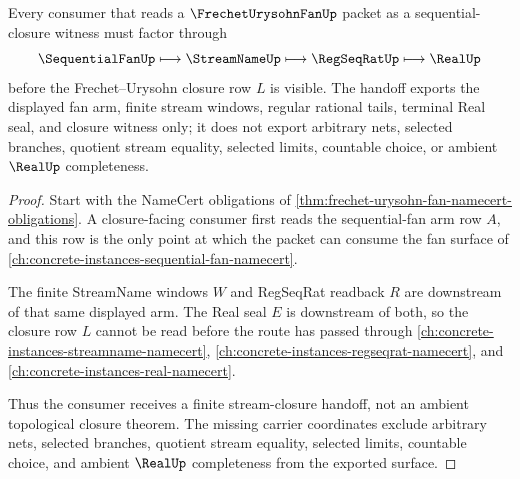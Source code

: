 \begin{theorem}
\label{thm:frechet-urysohn-fan-stream-closure-handoff}
Every consumer that reads a $\FrechetUrysohnFanUp$ packet as a sequential-closure witness must factor through
$$
\SequentialFanUp \longmapsto \StreamNameUp \longmapsto \RegSeqRatUp \longmapsto \RealUp
$$
before the Frechet--Urysohn closure row $L$ is visible. The handoff exports the displayed fan arm, finite stream windows, regular rational tails, terminal Real seal, and closure witness only; it does not export arbitrary nets, selected branches, quotient stream equality, selected limits, countable choice, or ambient $\RealUp$ completeness.
\end{theorem}
\begin{proof}
Start with the NameCert obligations of \autoref{thm:frechet-urysohn-fan-namecert-obligations}. A closure-facing consumer first reads the sequential-fan arm row $A$, and this row is the only point at which the packet can consume the fan surface of \autoref{ch:concrete-instances-sequential-fan-namecert}.

The finite StreamName windows $W$ and RegSeqRat readback $R$ are downstream of that same displayed arm. The Real seal $E$ is downstream of both, so the closure row $L$ cannot be read before the route has passed through \autoref{ch:concrete-instances-streamname-namecert}, \autoref{ch:concrete-instances-regseqrat-namecert}, and \autoref{ch:concrete-instances-real-namecert}.

Thus the consumer receives a finite stream-closure handoff, not an ambient topological closure theorem. The missing carrier coordinates exclude arbitrary nets, selected branches, quotient stream equality, selected limits, countable choice, and ambient $\RealUp$ completeness from the exported surface.
\end{proof}


\begin{closurestatus}{\FrechetUrysohnFanUp}
  \theoryclosure{\seedClosure}
  \formalstatus{\unformalizedV}
\end{closurestatus}
